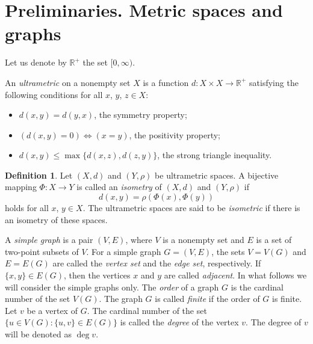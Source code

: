 \documentclass[11pt]{article}
\theoremstyle{definition}
\newtheorem{definition}[theorem]{Definition}
\theoremstyle{remark}
\numberwithin{equation}{section}
\begin{document}
\section{Preliminaries.
Metric spaces and graphs}


\hspace{5 mm} Let us denote by $\mathbb{R}^+$ the set $[0, \infty)$.


An \textit{ultrametric} on a nonempty set $X$ is a function $d\colon X\times X\rightarrow \mathbb R^+$ satisfying the following conditions for all 
 \(x\), \(y\), \(z \in X\):
\begin{itemize}[left=10pt]
\item[(i)]  $d(x,y)=d(y,x)$, the symmetry property;
\item[(ii)] $(d(x,y)=0)\iff (x=y)$, the positivity property;
\item[(iii)] 
\(d(x,y) \leq \max\{d(x,z), d(z,y)\}\), the strong triangle inequality.
\end{itemize}




\begin{definition}\label{d2.2}
Let \((X, d)\) and \((Y, \rho)\) be ultrametric spaces. A bijective mapping \(\Phi \colon X \to Y\) is called an {\it isometry} of \((X, d)\) and \((Y, \rho)\) if
\[
d(x,y) = \rho(\Phi(x), \Phi(y))
\]
holds for all \(x\), \(y \in X\).  The ultrametric spaces are said to be  {\it isometric} if there is an isometry of these spaces.
\end{definition}





























 A \textit{simple graph} is a pair $(V, E)$, where $V$ is a nonempty set and $E$ is a set of two-point subsets of $V$. For a simple graph $G = (V, E)$, the sets $V = V(G)$ and $E = E(G)$ are called the \textit{vertex set} and the \textit{edge set}, respectively. If $\{x, y\} \in E(G)$, then the vertices $x$ and $y$ are called \textit{adjacent}.  In what follows we will consider the simple graphs only. The {\it order} of a graph \(G\) is the cardinal number of the set \(V(G)\).
The graph \(G\) is called \emph{finite} if the order of \(G\) is finite. Let $v$ be a vertex of $G$. The cardinal number of the set 
$\{u \in V(G) : \{u, v\} \in E(G)\}$ 
is called the {\it degree} of the vertex $v$. The degree of $v$ will be denoted as $\operatorname{deg} v$. 
\end{document}
